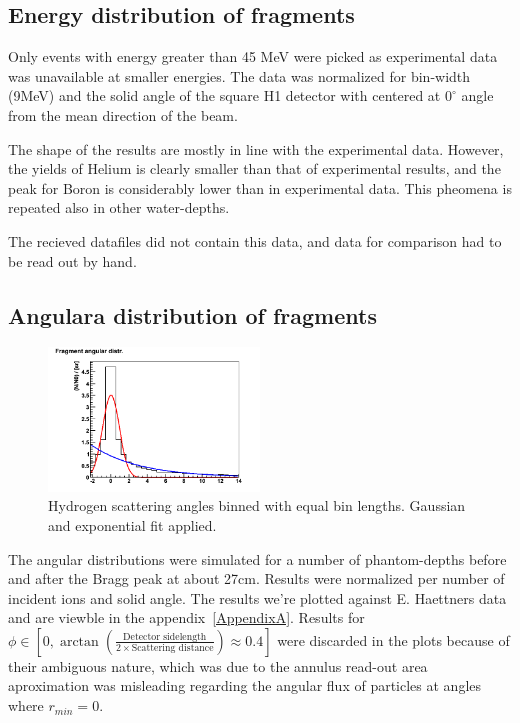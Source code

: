 \subsection{Energy distribution of fragments}
Only events with energy greater than 45 MeV were picked as experimental data was unavailable at smaller energies. The data was normalized for bin-width (9MeV) and the solid angle of the square H1 detector with centered at $0^{\circ}$ angle from the mean direction of the beam.

The shape of the results are mostly in line with the experimental data. However, the yields of Helium is clearly smaller than that of experimental results, and the peak for Boron is considerably lower than in experimental data. This pheomena is repeated also in other water-depths.

The recieved datafiles did not contain this data, and data for comparison had to be read out by hand.

\subsection{Angulara distribution of fragments}
\begin{figure}[!h] 
\begin{center}
\includegraphics[width=0.5\textwidth]{images/plots/angularDistributions/equlBinnedHydrogen279.png}  
\caption{\label{fig:binnedHydrogen} Hydrogen scattering angles binned with equal bin lengths. Gaussian and exponential fit applied.}
 \end{center}
 \end{figure}
The angular distributions were simulated for a number of phantom-depths before and after the Bragg peak at about 27cm. Results were normalized per number of incident ions and solid angle. The results we're plotted against E. Haettners data and are viewble in the appendix~\ref{AppendixA}. Results for $\phi \in [0,\arctan(\frac{\text{Detector sidelength}}{2 \times \text{Scattering distance}}) \approx 0.4]$ were discarded in the plots because of their ambiguous nature, which was due to the annulus read-out area aproximation was misleading regarding the angular flux of particles at angles where $r_{min} = 0$.


